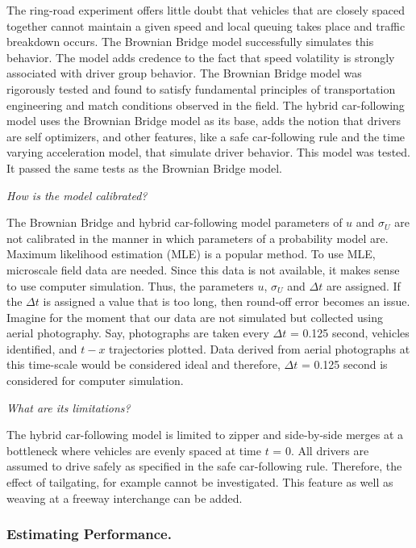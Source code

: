 \documentclass[Proceedings]{ascelike}
\begin{document}
 The ring-road experiment offers little doubt that vehicles that are closely spaced together cannot maintain a given speed and local queuing takes place and traffic breakdown occurs. The Brownian Bridge model successfully simulates this behavior. The model adds credence to the fact that speed volatility is strongly associated with driver group behavior. The Brownian Bridge model was  rigorously tested and found to satisfy fundamental principles of transportation engineering and match conditions observed in the field. The hybrid car-following model uses the Brownian Bridge model as its base, adds the notion that drivers are self optimizers, and other features, like a safe car-following rule and the time varying acceleration model, that simulate driver behavior. This model was tested. It passed the same tests as the Brownian Bridge model.

\noindent \emph{How is the model calibrated? } 

The Brownian Bridge and hybrid car-following model parameters of $u$ and $\sigma_U$ are not calibrated in the manner in which parameters of a probability model are. Maximum likelihood estimation (MLE) is a popular method. To use MLE, microscale field data are needed. Since this data is not available, it makes sense to use computer simulation. Thus, the parameters $u$, $\sigma_U$ and $\Delta t$ are assigned.  If the $\Delta t$ is assigned a value that is too long, then round-off error becomes an issue. Imagine for the moment that our data are not simulated but collected using aerial photography. Say, photographs are taken every  $\Delta t$ = 0.125 second,  vehicles identified, and $t-x$ trajectories plotted. Data derived from aerial photographs at this time-scale would be considered ideal and therefore, $\Delta t$ = 0.125 second is considered for computer simulation.

\noindent \emph{What are its limitations?} 

The hybrid car-following model is limited to zipper and side-by-side merges at a bottleneck where vehicles are  evenly spaced at time $t$ = 0. All drivers are assumed to drive safely as specified in the safe car-following rule. Therefore, the effect of tailgating, for example cannot be investigated. This feature as well as  weaving at a freeway interchange can be added. 

\subsubsection{Estimating Performance.} 
\end{document}

